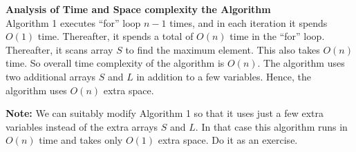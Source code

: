 \documentclass[11pt]{article}
\begin{document}
\noindent
{\bf Analysis of Time and Space complexity the Algorithm}\\

Algorithm 1 executes ``for'' loop $n-1$ times, and in each iteration it spends
$O(1)$ time. Thereafter, it spends a total of $O(n)$ time in the ``for'' loop.
Thereafter, it scans array $S$ to find the maximum element. This also takes
$O(n)$ time. So overall time complexity of the algorithm is $O(n)$.
The algorithm uses two additional arrays $S$ and $L$ in addition to
a few variables. Hence, the algorithm uses $O(n)$ extra space.

\textbf{Note:} We can suitably modify  Algorithm 1 so that it uses just 
a few extra variables instead of the extra arrays $S$ and $L$.
In that case this algorithm runs in $O(n)$ time and takes only $O(1)$ extra 
space. Do it as an exercise.\\
\end{document}
